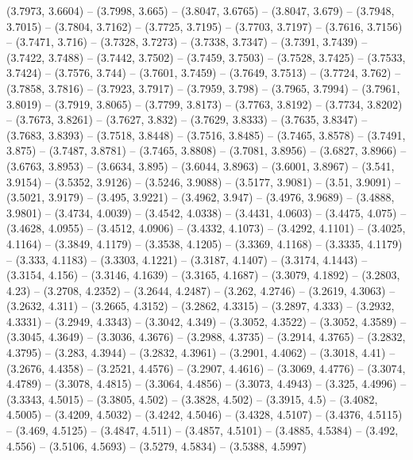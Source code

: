 {  (3.7973, 3.6604) -- (3.7998, 3.665) -- (3.8047, 3.6765) -- (3.8047, 3.679) -- 
  (3.7948, 3.7015) -- (3.7804, 3.7162) -- (3.7725, 3.7195) -- (3.7703, 3.7197) 
  -- (3.7616, 3.7156) -- (3.7471, 3.716) -- (3.7328, 3.7273) -- (3.7338, 3.7347)
   -- (3.7391, 3.7439) -- (3.7422, 3.7488) -- (3.7442, 3.7502) -- (3.7459, 
  3.7503) -- (3.7528, 3.7425) -- (3.7533, 3.7424) -- (3.7576, 3.744) -- (3.7601,
   3.7459) -- (3.7649, 3.7513) -- (3.7724, 3.762) -- (3.7858, 3.7816) -- 
  (3.7923, 3.7917) -- (3.7959, 3.798) -- (3.7965, 3.7994) -- (3.7961, 3.8019) --
   (3.7919, 3.8065) -- (3.7799, 3.8173) -- (3.7763, 3.8192) -- (3.7734, 3.8202) 
  -- (3.7673, 3.8261) -- (3.7627, 3.832) -- (3.7629, 3.8333) -- (3.7635, 3.8347)
   -- (3.7683, 3.8393) -- (3.7518, 3.8448) -- (3.7516, 3.8485) -- (3.7465, 
  3.8578) -- (3.7491, 3.875) -- (3.7487, 3.8781) -- (3.7465, 3.8808) -- (3.7081,
   3.8956) -- (3.6827, 3.8966) -- (3.6763, 3.8953) -- (3.6634, 3.895) -- 
  (3.6044, 3.8963) -- (3.6001, 3.8967) -- (3.541, 3.9154) -- (3.5352, 3.9126) --
   (3.5246, 3.9088) -- (3.5177, 3.9081) -- (3.51, 3.9091) -- (3.5021, 3.9179) --
   (3.495, 3.9221) -- (3.4962, 3.947) -- (3.4976, 3.9689) -- (3.4888, 3.9801) --
   (3.4734, 4.0039) -- (3.4542, 4.0338) -- (3.4431, 4.0603) -- (3.4475, 4.075) 
  -- (3.4628, 4.0955) -- (3.4512, 4.0906) -- (3.4332, 4.1073) -- (3.4292, 
  4.1101) -- (3.4025, 4.1164) -- (3.3849, 4.1179) -- (3.3538, 4.1205) -- 
  (3.3369, 4.1168) -- (3.3335, 4.1179) -- (3.333, 4.1183) -- (3.3303, 4.1221) --
   (3.3187, 4.1407) -- (3.3174, 4.1443) -- (3.3154, 4.156) -- (3.3146, 4.1639) 
  -- (3.3165, 4.1687) -- (3.3079, 4.1892) -- (3.2803, 4.23) -- (3.2708, 4.2352) 
  -- (3.2644, 4.2487) -- (3.262, 4.2746) -- (3.2619, 4.3063) -- (3.2632, 4.311) 
  -- (3.2665, 4.3152) -- (3.2862, 4.3315) -- (3.2897, 4.333) -- (3.2932, 4.3331)
   -- (3.2949, 4.3343) -- (3.3042, 4.349) -- (3.3052, 4.3522) -- (3.3052, 
  4.3589) -- (3.3045, 4.3649) -- (3.3036, 4.3676) -- (3.2988, 4.3735) -- 
  (3.2914, 4.3765) -- (3.2832, 4.3795) -- (3.283, 4.3944) -- (3.2832, 4.3961) --
   (3.2901, 4.4062) -- (3.3018, 4.41) -- (3.2676, 4.4358) -- (3.2521, 4.4576) --
   (3.2907, 4.4616) -- (3.3069, 4.4776) -- (3.3074, 4.4789) -- (3.3078, 4.4815) 
  -- (3.3064, 4.4856) -- (3.3073, 4.4943) -- (3.325, 4.4996) -- (3.3343, 4.5015)
   -- (3.3805, 4.502) -- (3.3828, 4.502) -- (3.3915, 4.5) -- (3.4082, 4.5005) --
   (3.4209, 4.5032) -- (3.4242, 4.5046) -- (3.4328, 4.5107) -- (3.4376, 4.5115) 
  -- (3.469, 4.5125) -- (3.4847, 4.511) -- (3.4857, 4.5101) -- (3.4885, 4.5384) 
  -- (3.492, 4.556) -- (3.5106, 4.5693) -- (3.5279, 4.5834) -- (3.5388, 4.5997) 
}
